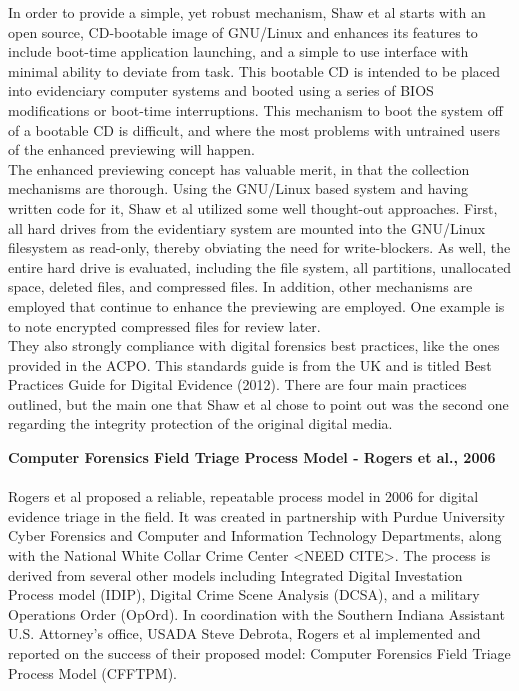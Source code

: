 \documentclass[12pt]{article}
\begin{document}
In order to provide a simple, yet robust mechanism, Shaw et al\cite{shaw2013practical} starts with an open source,
CD-bootable image of GNU/Linux and enhances its features to include boot-time application launching, and a simple
to use interface with minimal ability to deviate from task.  This bootable CD is intended to be placed into 
evidenciary computer systems and booted using a series of BIOS modifications or boot-time interruptions.  This 
mechanism to boot the system off of a bootable CD is difficult, and where the most problems with untrained users
of the enhanced previewing will happen.\\

The enhanced previewing concept has valuable merit, in that the collection mechanisms are thorough.  Using the
GNU/Linux based system and having written code for it, Shaw et al\cite{shaw2013practical} utilized some well
thought-out approaches.  First, all hard drives from the evidentiary system are mounted into the GNU/Linux
filesystem as read-only, thereby obviating the need for write-blockers.  As well, the entire hard drive is
evaluated, including the file system, all partitions, unallocated space, deleted files, and compressed files.  In
addition, other mechanisms are employed that continue to enhance the previewing are employed.  One example is to
note encrypted compressed files for review later.\\

They also strongly compliance with digital forensics best practices, like the ones provided in the ACPO.  This
standards guide is from the UK and is titled Best Practices Guide for Digital Evidence (2012).  There are four
main practices outlined, but the main one that Shaw et al\cite{shaw2013practical} chose to point out was the
second one regarding the integrity protection of the original digital media.
\vspace{0.5 cm}

\textbf{Computer Forensics Field Triage Process Model - Rogers et al., 2006\cite{rogers2006computer}}\\
\\

Rogers et al\cite{rogers2006computer} proposed a reliable, repeatable process model in 2006 for digital evidence
triage in the field.  It was created in partnership with Purdue University Cyber Forensics and Computer and Information
Technology Departments, along with the National White Collar Crime Center <NEED CITE>.  The process is derived from
several other models including Integrated Digital Investation Process model (IDIP), Digital Crime Scene Analysis (DCSA),
and a military Operations Order (OpOrd).  In coordination with the Southern Indiana Assistant U.S. Attorney's office,
USADA Steve Debrota, Rogers et al\cite{rogers2006computer} implemented and reported on the success of their proposed
model: Computer Forensics Field Triage Process Model (CFFTPM).\\
\end{document}
